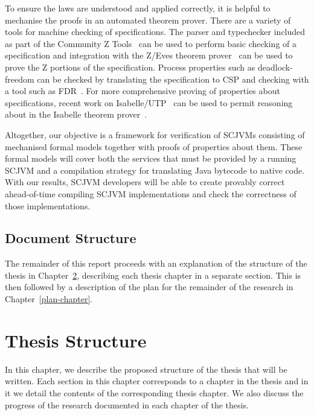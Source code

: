 \documentclass[a4paper,10pt]{report}
\begin{document}
To ensure the laws are understood and applied correctly, it is helpful
to mechanise the proofs in an automated theorem prover.
There are a variety of tools for machine checking of \Circus{}
specifications.
The \Circus{} parser and typechecker included as part of the Community
Z Tools~\cite{malik2011, xavier2008, malik2005, miller2005} can be
used to perform basic checking of a \Circus{} specification and
integration with the Z/Eves theorem prover~\cite{saaltink1997} can be
used to prove the Z portions of the \Circus{} specification.
Process properties such as deadlock-freedom can be checked by
translating the \Circus{} specification to CSP and checking with a
tool such as FDR~\cite{gibson-robinson2014}.
For more comprehensive proving of properties about \Circus{}
specifications, recent work on Isabelle/UTP~\cite{foster2015} can be
used to permit reasoning about \Circus{} in the Isabelle theorem
prover~\cite{nipkow2002}.

Altogether, our objective is a framework for verification of SCJVMs
consisting of mechanised formal models together with proofs of
properties about them.
These formal models will cover both the services that must be provided
by a running SCJVM and a compilation strategy for translating Java
bytecode to native code.
With our results, SCJVM developers will be able to create provably
correct ahead-of-time compiling SCJVM implementations and check the
correctness of those implementations.


\section{Document Structure}
\label{document-structure-section}

The remainder of this report proceeds with an explanation of the
structure of the thesis in Chapter~\ref{thesis-structure-chapter},
describing each thesis chapter in a separate section.
This is then followed by a description of the plan for the remainder
of the research in Chapter~\ref{plan-chapter}.
 

\chapter{Thesis Structure}
\label{thesis-structure-chapter}

In this chapter, we describe the proposed structure of the thesis that
will be written.
Each section in this chapter corresponds to a chapter in the thesis
and in it we detail the contents of the corresponding thesis chapter.
We also discuss the progress of the research documented in each
chapter of the thesis.
\end{document}
